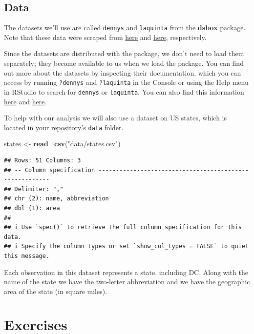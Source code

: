 \documentclass[
]{article}
\newenvironment{Shaded}{\begin{snugshade}}{\end{snugshade}}
\newcommand{\FunctionTok}[1]{\textcolor[rgb]{0.13,0.29,0.53}{\textbf{#1}}}
\newcommand{\NormalTok}[1]{#1}
\newcommand{\OtherTok}[1]{\textcolor[rgb]{0.56,0.35,0.01}{#1}}
\newcommand{\StringTok}[1]{\textcolor[rgb]{0.31,0.60,0.02}{#1}}
\begin{document}
\subsection{Data}\label{data}

The datasets we'll use are called \texttt{dennys} and \texttt{laquinta}
from the \textbf{dsbox} package. Note that these data were scraped from
\href{https://locations.dennys.com/}{here} and
\href{https://www.lq.com/en/findandbook/hotel-listings.html}{here},
respectively.

Since the datasets are distributed with the package, we don't need to
load them separately; they become available to us when we load the
package. You can find out more about the datasets by inspecting their
documentation, which you can access by running \texttt{?dennys} and
\texttt{?laquinta} in the Console or using the Help menu in RStudio to
search for \texttt{dennys} or \texttt{laquinta}. You can also find this
information
\href{https://rstudio-education.github.io/dsbox/reference/dennys.html}{here}
and
\href{https://rstudio-education.github.io/dsbox/reference/laquinta.html}{here}.

To help with our analysis we will also use a dataset on US states, which
is located in your repository's \texttt{data} folder.

\begin{Shaded}
\begin{Highlighting}[]
\NormalTok{states }\OtherTok{\textless{}{-}} \FunctionTok{read\_csv}\NormalTok{(}\StringTok{"data/states.csv"}\NormalTok{)}
\end{Highlighting}
\end{Shaded}

\begin{verbatim}
## Rows: 51 Columns: 3
## -- Column specification --------------------------------------------------------
## Delimiter: ","
## chr (2): name, abbreviation
## dbl (1): area
## 
## i Use `spec()` to retrieve the full column specification for this data.
## i Specify the column types or set `show_col_types = FALSE` to quiet this message.
\end{verbatim}

Each observation in this dataset represents a state, including DC. Along
with the name of the state we have the two-letter abbreviation and we
have the geographic area of the state (in square miles).

\section{Exercises}\label{exercises}
\end{document}
